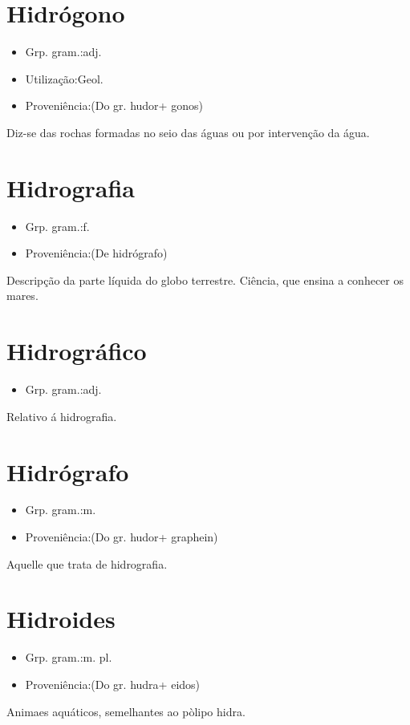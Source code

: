 \documentclass{article}
\begin{document}
\section{Hidrógono}
\begin{itemize}
\item {Grp. gram.:adj.}
\end{itemize}
\begin{itemize}
\item {Utilização:Geol.}
\end{itemize}
\begin{itemize}
\item {Proveniência:(Do gr. \textunderscore hudor\textunderscore  + \textunderscore gonos\textunderscore )}
\end{itemize}
Diz-se das rochas formadas no seio das águas ou por intervenção da água.
\section{Hidrografia}
\begin{itemize}
\item {Grp. gram.:f.}
\end{itemize}
\begin{itemize}
\item {Proveniência:(De \textunderscore hidrógrafo\textunderscore )}
\end{itemize}
Descripção da parte líquida do globo terrestre.
Ciência, que ensina a conhecer os mares.
\section{Hidrográfico}
\begin{itemize}
\item {Grp. gram.:adj.}
\end{itemize}
Relativo á hidrografia.
\section{Hidrógrafo}
\begin{itemize}
\item {Grp. gram.:m.}
\end{itemize}
\begin{itemize}
\item {Proveniência:(Do gr. \textunderscore hudor\textunderscore  + \textunderscore graphein\textunderscore )}
\end{itemize}
Aquelle que trata de hidrografia.
\section{Hidroides}
\begin{itemize}
\item {Grp. gram.:m. pl.}
\end{itemize}
\begin{itemize}
\item {Proveniência:(Do gr. \textunderscore hudra\textunderscore  + \textunderscore eidos\textunderscore )}
\end{itemize}
Animaes aquáticos, semelhantes ao pòlipo hidra.
\end{document}
